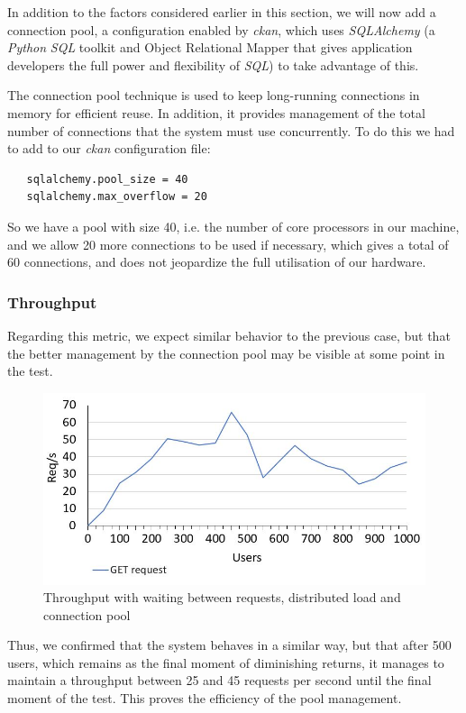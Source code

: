   In addition to the factors considered earlier in this section, we will now add a connection pool, a configuration enabled by \textit{\gls{ckan}}, which uses \textit{SQLAlchemy} (a \textit{Python} \textit{SQL} toolkit and Object Relational Mapper that gives application developers the full power and flexibility of \textit{SQL}) to take advantage of this.
  
  The connection pool technique is used to keep long-running connections in memory for efficient reuse. In addition, it provides management of the total number of connections that the system must use concurrently. To do this we had to add to our \textit{\gls{ckan}} configuration file:
  
  \begin{verbatim}
   sqlalchemy.pool_size = 40
   sqlalchemy.max_overflow = 20
  \end{verbatim}
  
  So we have a pool with size 40, i.e. the number of core processors in our machine, and we allow 20 more connections to be used if necessary, which gives a total of 60 connections, and does not jeopardize the full utilisation of our hardware.
  
  \subsubsection{Throughput}
  
  Regarding this metric, we expect similar behavior to the previous case, but that the better management by the connection pool may be visible at some point in the test.
  
  \begin{figure}[H]
    \centering
    \includegraphics[width=.8\textwidth]{img/performance_evaluation/pool.JPG}
    \caption{Throughput with waiting between requests, distributed load and connection pool}
  \end{figure}
  
  Thus, we confirmed that the system behaves in a similar way, but that after 500 users, which remains as the final moment of diminishing returns, it manages to maintain a throughput between 25 and 45 requests per second until the final moment of the test. This proves the efficiency of the pool management.
  
